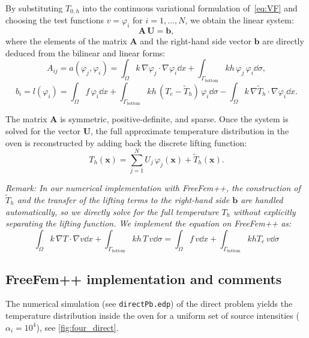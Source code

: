 By substituting $T_{0,h}$ into the continuous variational formulation of~\cref{eq:VF} and choosing the test functions $v = \varphi_i$ for $i=1, \dots, N$, we obtain the linear system:
\begin{equation}
\mathbf{A}\,\mathbf{U} = \mathbf{b},
\end{equation}
where the elements of the matrix $\mathbf{A}$ and the right-hand side vector $\mathbf{b}$ are directly deduced from the bilinear and linear forms:
\begin{equation}
A_{ij} = a(\varphi_j, \varphi_i) = \int_\Omega k\,\nabla\varphi_j\cdot\nabla\varphi_i\dd x + \int_{\Gamma_{\text{bottom}}} k h\,\varphi_j\,\varphi_i\dd\sigma,
\end{equation}
\begin{equation}
b_i = l(\varphi_i) = \int_\Omega f\,\varphi_i\dd x + \int_{\Gamma_{\text{bottom}}} k h\,(T_e - \tilde{T}_h)\,\varphi_i\dd\sigma - \int_\Omega k\,\nabla \tilde{T}_h \cdot \nabla \varphi_i \dd x.
\end{equation}

The matrix $\mathbf{A}$ is symmetric, positive-definite, and sparse. Once the system is solved for the vector $\mathbf{U}$, the full approximate temperature distribution in the oven is reconstructed by adding back the discrete lifting function:
\begin{equation}
T_h(\mathbf{x}) = \sum_{j=1}^N U_j\,\varphi_j(\mathbf{x}) + \tilde{T}_h(\mathbf{x}).
\end{equation}

\textit{Remark: In our numerical implementation with FreeFem++, the construction of $\tilde{T}_h$ and the transfer of the lifting terms to the right-hand side $\mathbf{b}$ are handled automatically, so we directly solve for the full temperature $T_h$ without explicitly separating the lifting function. We implement the equation on FreeFem++ as:
\begin{equation}
\int_\Omega k\,\nabla T \cdot \nabla v \dd x + \int_{\Gamma_{\text{bottom}}} k h\,T\,v \dd\sigma
= \int_\Omega f\,v \dd x + \int_{\Gamma_{\text{bottom}}} k h T_e\,v \dd\sigma
\end{equation}
}

\subsection{FreeFem++ implementation and comments}

The numerical simulation (see \texttt{directPb.edp}) of the direct problem yields the temperature distribution inside the oven for a uniform set of source intensities ($\alpha_i = 10^4$), see \cref{fig:four_direct}.

